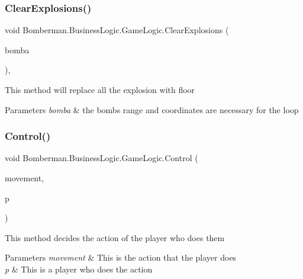 \subsubsection{\texorpdfstring{ClearExplosions()}{ClearExplosions()}}
{\footnotesize\ttfamily void Bomberman.\+Business\+Logic.\+Game\+Logic.\+Clear\+Explosions (\begin{DoxyParamCaption}\item[{\mbox{\hyperlink{class_bomberman_1_1_model_1_1_bomb}{Bomb}}}]{bomba }\end{DoxyParamCaption})\hspace{0.3cm}{\ttfamily [inline]}, {\ttfamily [private]}}



This method will replace all the explosion with floor 


\begin{DoxyParams}{Parameters}
{\em bomba} & the bombs range and coordinates are necessary for the loop\\
\hline
\end{DoxyParams}
\mbox{\label{class_bomberman_1_1_business_logic_1_1_game_logic_a452baa5a3f7c27d25e2b3c1d0212596e}} 
\subsubsection{\texorpdfstring{Control()}{Control()}}
{\footnotesize\ttfamily void Bomberman.\+Business\+Logic.\+Game\+Logic.\+Control (\begin{DoxyParamCaption}\item[{\mbox{\hyperlink{namespace_bomberman_1_1_business_logic_1_1_enum_ae31d051394d251f13cbd72f883375601}{Movement}}}]{movement,  }\item[{\mbox{\hyperlink{class_bomberman_1_1_model_1_1_player}{Player}}}]{p }\end{DoxyParamCaption})\hspace{0.3cm}{\ttfamily [inline]}}



This method decides the action of the player who does them 


\begin{DoxyParams}{Parameters}
{\em movement} & This is the action that the player does\\
\hline
{\em p} & This is a player who does the action\\
\hline
\end{DoxyParams}
\mbox{\label{class_bomberman_1_1_business_logic_1_1_game_logic_aa228edcc60791fba9e3a8495f1c6ee63}} 
